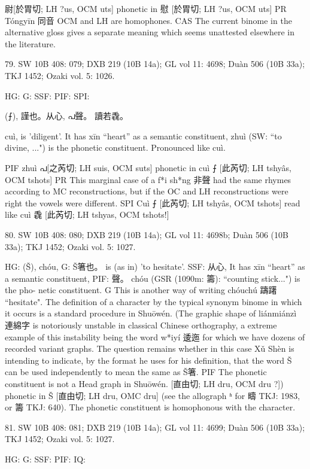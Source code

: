 尉[於胃切; LH ?us, OCM uts] phonetic in 慰 [於胃切; LH ?us, OCM uts]
PR	Tóngyīn 同音 OCM and LH are homophones.
CAS The current binome in the alternative gloss gives a separate meaning which seems unattested elsewhere in the literature.

79. SW 10B 408: 079; DXB 219 (10B 14a); GL vol 11: 4698; Duàn 506 (10B 33a); TKJ 1452; Ozaki vol. 5: 1026.


HG:
G: SSF: PIF: SPI:

(⨍),
謹也。从心, പ聲。
讀若毳。

cuì,
is 'diligent'.
It has xīn ``heart'' as a semantic constituent,
zhuì (SW: ``to divine, ...") is the phonetic constituent. Pronounced like cuì.

PIF     zhuì പ[之芮切; LH suis, OCM suts] phonetic in cuì ⨍ [此芮切; LH tshyâs, OCM tshots]
PR	This marginal case of a f*i sh*ng 非聲 had the same rhymes according to MC reconstructions, but if the OC and LH reconstructions were right the vowels were different.
SPI      Cuì ⨍ [此芮切; LH tshyâs, OCM tshots] read like cuì 毳 [此芮切; LH tshyas, OCM tshots!]

80. SW 10B 408: 080; DXB 219 (10B 14a); GL vol 11: 4698b; Duàn 506 (10B 33a); TKJ 1452; Ozaki vol. 5: 1027.


HG:
(Š),
chóu,
G:
Š箸也。
is (as in) 'to hesitate'.
SSF:
从心,
It has xīn ``heart'' as a semantic constituent,
PIF:
聲。
chóu (GSR (1090m: 籌): ``counting stick...") is the pho- netic constituent.
G This is another way of writing chóuchú 躊躇 ``hesitate". The definition of a character by the typical synonym binome in which it occurs is a standard procedure in Shuōwén. (The graphic shape of liánmiánzì 連綿字 is notoriously unstable in classical Chinese orthography, a extreme example of this instability being the word w*iyí 逶迤 for which we have dozens of recorded variant graphs. The question remains whether in this case Xǔ Shèn is intending to indicate, by the format he uses for his definition, that the word Š can be used independently to mean the same as Š箸.
PIF The phonetic constituent is not a Head graph in Shuōwén.
      [直由切; LH dru, OCM dru ?]) phonetic in Š [直由切; LH dru, OMC dru] (see the allograph ʱ for 疇 TKJ: 1983, or 籌 TKJ: 640).
The phonetic constituent is homophonous with the character.



81. SW 10B 408: 081; DXB 219 (10B 14a); GL vol 11: 4699; Duàn 506 (10B 33a); TKJ 1452; Ozaki vol. 5: 1027.


HG:
G: SSF: PIF: IQ:

